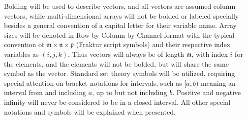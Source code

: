 %
%
%
%
%
%

%
%
%
\indent
Bolding will be used to describe vectors, and all vectors are assumed column vectors, while multi-dimensional arrays will not be bolded or labeled specially besides a general convention of a capital letter for their variable name. Array sizes will be denoted in Row-by-Column-by-Channel format with the typical convention of $\mathfrak{m} \times \mathfrak{n} \times \mathfrak{p}$ (Fraktur script symbols) and their respective index variables as $(i,j,k)$. Thus vectors will always be of length $\mathfrak{m}$, with index $i$ for the elements, and the elements will not be bolded, but will share the same symbol as the vector. Standard set theory symbols will be utilized, requiring special attention on bracket notations for intervals, such as $[a,b)$ meaning an interval from and including $a$, up to but not including $b$. Positive and negative infinity will never be considered to be in a closed interval. All other special notations and symbols will be explained when presented.



